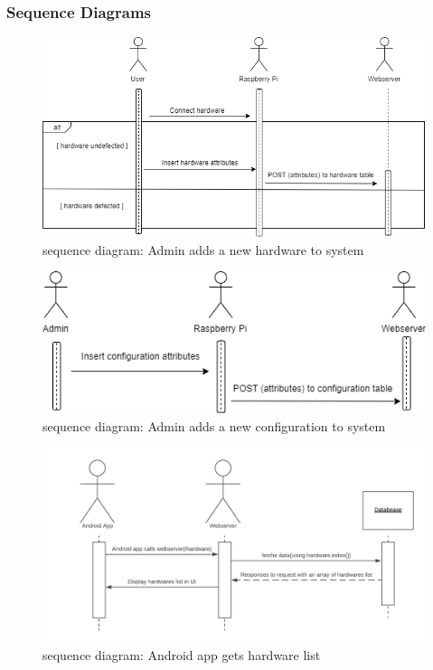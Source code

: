 \documentclass[12pt, oneside, a4paper]{book}
\begin{document}
				\subsubsection{Sequence Diagrams}
				\begin{figure}[H]
					\caption{sequence diagram: Admin adds a new hardware to system}
					\label{admin_hw}
					\includegraphics[width=\linewidth]{img/sequence_add_hardware.png}
				\end{figure}
				\begin{figure}[H]
					\caption{sequence diagram: Admin adds a new configuration to system}
					\label{admin_config}
					\includegraphics[width=\linewidth]{img/sequence_add_config.png}
				\end{figure}
				\begin{figure}[H]
					\caption{sequence diagram: Android app gets hardware list}
					\label{android_hw}
					\includegraphics[width=\linewidth]{img/sequence_android_hw.png}
				\end{figure}
\end{document}
